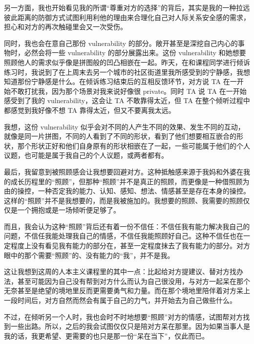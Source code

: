 \tristarsepline

另一方面，我也开始看见我的所谓“尊重对方的选择”的背后，其实是我的一种拉远彼此距离的防御方式\pozhehao{}试图利用利他的理由来合理化自己对人际关系安全感的需求，担心和对方的再次触碰里会又一次受伤。

同时，我也会在意自己那份 vulnerability 的部分。敞开甚至是深挖自己内心的事物时，必然会将一些 vulnerability 的部分展露出来。这份 vulnerability 和她想要照顾他人的需求似乎像是拼图般的凹凸相嵌在一起。昨天，在和课程同学进行倾诉练习时，我说到了在上周末去另一个城市的社区街道里我所感受到的宁静感，我想知道那份宁静感是什么。在倾诉练习结束后的互相反馈环节，对方说 TA 在一开始不敢打扰我，因为那个场景对我来说好像很 private。同时 TA 说 TA 在一开始感受到了我的 vulnerability，这会让 TA 不敢靠得太近，但 TA 在整个倾听过程中都感觉到我好像不想 TA 靠得太近，但又不要离我太远。

我想，这份 vulnerability 似乎会对不同的人产生不同的效果、发生不同的互动，就像是同一片拼图，不同的人看到了不同的形状，看到了他们想要相互嵌合的形状，那个形状正好和他们自身原有的形状相嵌在了一起，一些可能属于他们的个人议题，也可能是属于我自己的个人议题，或两者都有。

\tristarsepline

最后，我留意到被照顾感会让我想要回避对方。这种抵触感来源于我妈和外婆在我的成长历程里的“照顾”，但那种“照顾”并不是真正的照顾，而更像是一种借照顾为由的操控，一种否定我的能力、认知、感知、想法、情感甚至是存在本身的操控。这样的“照顾”并不是我想要的，而是我被施加的。我想要的照顾、我需要的照顾仅仅是一个拥抱或是一场倾听便足够了。

而且，我会认为这种“照顾”背后还有着一份不信任：不信任我有能力解决我自己的问题，不信任我能处理我自己的情感，不信任我能照顾好自己。这种不信任也在一定程度上没有看见我有能力的部分在，甚至一定程度抹去了我有能力的部分。对方眼中的那个需要“照顾”的、没有能力的“我”，并不是我。

这让我想到这周的人本主义课程里的其中一点：比起给对方提建议、替对方找办法，甚至可能因为自己没有帮到对方什么而认为自己很没用，与对方一起呆在那个无奈甚至是绝望的境地里反而更需要勇气和力量。而在那个境地里陪伴着对方呆上一段时间后，对方自然而然会有属于自己的力气，并开始去为自己做些什么。

不过，在倾听另一个人时，我也会时不时地想要“照顾”对方的情感，试图帮对方找到一些出路。所以，之后的我会试图仅仅只是陪对方呆在那里。因为如果当事人是我的话，我更希望、更需要的也只是那一份“呆在当下”，仅此而已。

